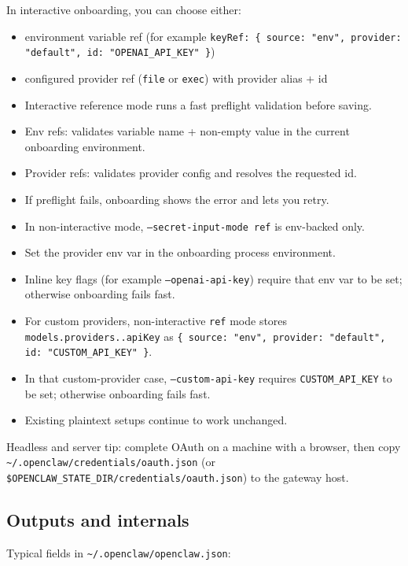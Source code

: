 In interactive onboarding, you can choose either:
\begin{itemize}
  \item environment variable ref (for example \texttt{keyRef: \{ source: "env", provider: "default", id: "OPENAI\_API\_KEY" \}})
  \item configured provider ref (\texttt{file} or \texttt{exec}) with provider alias + id
  \item Interactive reference mode runs a fast preflight validation before saving.
  \item Env refs: validates variable name + non-empty value in the current onboarding environment.
  \item Provider refs: validates provider config and resolves the requested id.
  \item If preflight fails, onboarding shows the error and lets you retry.
  \item In non-interactive mode, \texttt{--secret-input-mode ref} is env-backed only.
  \item Set the provider env var in the onboarding process environment.
  \item Inline key flags (for example \texttt{--openai-api-key}) require that env var to be set; otherwise onboarding fails fast.
  \item For custom providers, non-interactive \texttt{ref} mode stores \texttt{models.providers..apiKey} as \texttt{\{ source: "env", provider: "default", id: "CUSTOM\_API\_KEY" \}}.
  \item In that custom-provider case, \texttt{--custom-api-key} requires \texttt{CUSTOM\_API\_KEY} to be set; otherwise onboarding fails fast.
  \item Existing plaintext setups continue to work unchanged.
\end{itemize}


Headless and server tip: complete OAuth on a machine with a browser, then copy
\texttt{\textasciitilde{}/.openclaw/credentials/oauth.json} (or \texttt{\$OPENCLAW\_STATE\_DIR/credentials/oauth.json})
to the gateway host.

\subsection{Outputs and internals}


Typical fields in \texttt{\textasciitilde{}/.openclaw/openclaw.json}:

